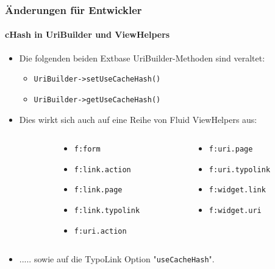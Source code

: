 \begin{frame}[fragile]
	\frametitle{Änderungen für Entwickler}
	\framesubtitle{cHash in UriBuilder und ViewHelpers}

	\lstset{basicstyle=\smaller\ttfamily}

	\begin{itemize}
		\item Die folgenden beiden Extbase UriBuilder-Methoden sind veraltet:

			\begin{itemize}
				\item \texttt{UriBuilder->setUseCacheHash()}
				\item \texttt{UriBuilder->getUseCacheHash()}
			\end{itemize}

		\item Dies wirkt sich auch auf eine Reihe von Fluid ViewHelpers aus:
	\end{itemize}
	\vspace{-0.4cm}
	\begin{columns}[T]
		\begin{column}{.05\textwidth}
		\end{column}
		\begin{column}{.45\textwidth}
			\begin{itemize}\smaller
				\item \texttt{f:form}
				\item \texttt{f:link.action}
				\item \texttt{f:link.page}
				\item \texttt{f:link.typolink}
				\item \texttt{f:uri.action}
			\end{itemize}\normalsize
		\end{column}
		\begin{column}{.45\textwidth}
			\begin{itemize}\smaller
				\item \texttt{f:uri.page}
				\item \texttt{f:uri.typolink}
				\item \texttt{f:widget.link}
				\item \texttt{f:widget.uri}
			\end{itemize}\normalsize
		\end{column}
	\end{columns}
	\vspace{0.2cm}
	\begin{itemize}
		\item ..... sowie auf die TypoLink Option "\texttt{useCacheHash}".
	\end{itemize}

\end{frame}

